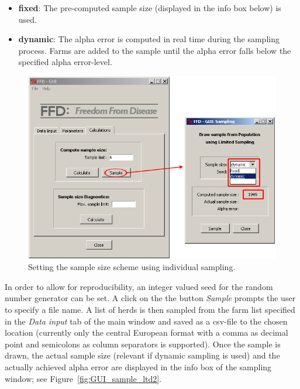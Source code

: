 \documentclass[nojss]{jss}
\begin{document}
\begin{itemize} \item \textbf{fixed}: The pre-computed sample size (displayed in the info box below) is used. \item \textbf{dynamic}: The alpha error is computed in real time during the sampling process. Farms are added to the sample until the alpha error falls below the specified alpha error-level. \end{itemize}

\begin{figure}[h!t]
\begin{center}
\includegraphics[width=120mm]{GUI_sample_ltd1.png}
\end{center}
\caption{Setting the sample size scheme using individual sampling.} \label{fig:GUI_sample_ltd1}
\end{figure}

In order to allow for reproducibility, an integer valued seed for the random number generator can be set. A click on the the button \emph{Sample} prompts the user to specify a file name. A list of herds is then sampled from the farm list specified in the \emph{Data input} tab of the main window and saved as a csv-file to the chosen location (currently only the central European format with a comma as decimal point and semicolons as column separators is supported). Once the sample is drawn, the actual sample size (relevant if dynamic sampling is used) and the actually achieved alpha error are displayed in the info box of the sampling window; see Figure~\ref{fig:GUI_sample_ltd2}.
\end{document}
